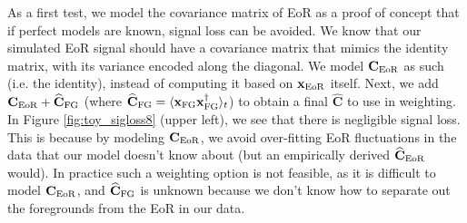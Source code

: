 \documentclass[preprint2,numberedappendix,tighten]{aastex6}  %
\begin{document}
As a first test, we model the covariance matrix of EoR as a proof of concept that if perfect models are known, signal loss can be 
avoided. We know that our simulated EoR signal should have a covariance matrix that mimics the identity matrix, with its 
variance encoded along the diagonal. We model $\textbf{C}_{\rm EoR}$ as such (i.e. the identity), instead of computing it based on $\textbf{x}
_{\rm EoR}$ itself. Next, we add $\textbf{C}_{\rm EoR} + \widehat{\textbf{C}}_{\rm FG}$ (where $\widehat{\textbf{C}}_{\rm FG} = \langle\textbf{x}_{\rm FG}
\textbf{x}_{\rm FG}^{\dagger}\rangle_{t}$) to obtain a final $\widehat{\textbf{C}}$ to use in weighting. In Figure \ref{fig:toy_sigloss8} (upper 
left), we see that there is negligible signal loss. This is because by modeling $\textbf{C}_{\rm EoR}$, we avoid over-fitting EoR fluctuations in the data that our model doesn't know about (but an empirically derived $\widehat{\textbf{C}}_{\rm EoR}$ would). 
In practice such a weighting option is not feasible, as it is difficult to model $\textbf{C}_{\rm EoR}$, and $\widehat{\textbf{C}}_{\rm FG}$ is unknown because we don't know how to separate out the foregrounds from the EoR in our data.
\end{document}
